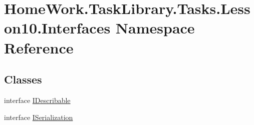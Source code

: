\hypertarget{namespace_home_work_1_1_task_library_1_1_tasks_1_1_lesson10_1_1_interfaces}{}\section{Home\+Work.\+Task\+Library.\+Tasks.\+Lesson10.\+Interfaces Namespace Reference}
\label{namespace_home_work_1_1_task_library_1_1_tasks_1_1_lesson10_1_1_interfaces}
\subsection*{Classes}
\begin{DoxyCompactItemize}
\item 
interface \mbox{\hyperlink{interface_home_work_1_1_task_library_1_1_tasks_1_1_lesson10_1_1_interfaces_1_1_i_describable}{I\+Describable}}
\item 
interface \mbox{\hyperlink{interface_home_work_1_1_task_library_1_1_tasks_1_1_lesson10_1_1_interfaces_1_1_i_serialization}{I\+Serialization}}
\end{DoxyCompactItemize}
